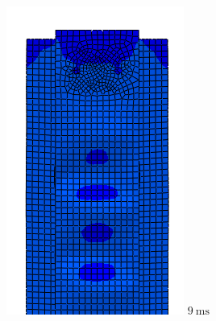 \documentclass[
documentsize = a4, %
font = cmr, %
typesize = 11, %
printmode = true,
onehalfspacing = true,
language = en, %
titlepage = udciccp, %
degree = pt, %
dedication = true,
acknowledgements = true,
abstract-en = true,
abstract-es = false,
abstract-ga = false,
epigraphs = true,
toc = true,
lof = true,
lot = true,
frontmatterintoc = false,
notation = false,
minimal = false,
]{UDCthesis}
\begin{document}
\begin{figure}
\begin{minipage}[b]{.15\linewidth}
		\includegraphics[width=\linewidth]{IMG_CUTRES/c3}
		$\SI{9}{\ms}$
	\end{minipage}
	\quad
	\begin{minipage}[b]{.15\linewidth}
		\centering

\end{minipage}
\end{figure}
\end{document}

